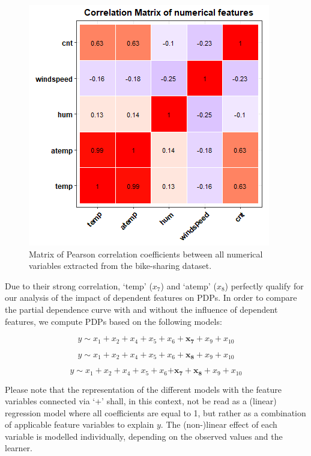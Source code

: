\documentclass[
]{krantz}
\begin{document}
\begin{figure}

{\centering \includegraphics[width=0.8\linewidth]{images/VK_PDP_3_Num_Correlation_Matrix} 

}

\caption{Matrix of Pearson correlation coefficients between all numerical variables extracted from the bike-sharing dataset.}\label{fig:Figure03}
\end{figure}

Due to their strong correlation, `temp' (\(x_7\)) and `atemp' (\(x_8\)) perfectly qualify for our analysis of the impact of dependent features on PDPs. In order to compare the partial dependence curve with and without the influence of dependent features, we compute PDPs based on the following models:

\begin{equation}
 y \sim x_1 + x_2 + x_4 + x_5 + x_6 + \mathbf{x_7}  + x_9 + x_{10} \label{eq:1} 
\end{equation}

\begin{equation}
 y \sim x_1 + x_2 + x_4 + x_5 + x_6 + \mathbf{x_8}  + x_9 + x_{10} \label{eq:2}
\end{equation}

\begin{equation}
 y \sim x_1 + x_2 + x_4 + x_5 + x_6 \mathbf{+ x_7 + x_8} + x_9 + x_{10} \label{eq:3}
\end{equation}

Please note that the representation of the different models with the feature variables connected via `+' shall, in this context, not be read as a (linear) regression model where all coefficients are equal to 1, but rather as a combination of applicable feature variables to explain \(y\). The (non-)linear effect of each variable is modelled individually, depending on the observed values and the learner.
\end{document}
